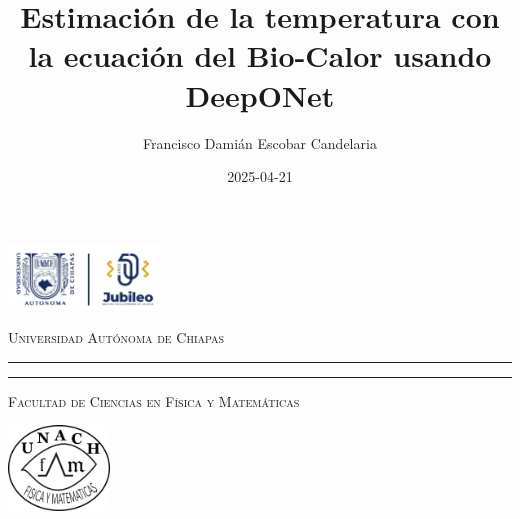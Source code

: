 \documentclass[
  spanish,
  us-letterpaper,
]{scrreprt}
\title{Estimación de la temperatura con la ecuación del Bio-Calor usando
DeepONet}
\author{Francisco Damián Escobar Candelaria}
\date{2025-04-21}
\theoremstyle{plain}
\theoremstyle{definition}
\theoremstyle{remark}
\begin{document}
\begin{titlepage}
\hspace{-1.7cm} %
\begin{minipage}[t][0.03\textheight][c]{0.22\textwidth}
        \includegraphics[width=4.0cm]{LOGO-JUBILEO.png}
\end{minipage}\hspace{0.9cm}
\begin{minipage}[t][0.03\textheight][c]{0.69\textwidth}
\begin{center}
                \textsc{\huge Universidad Autónoma de Chiapas}\\[0.3cm]
                \hrule height 2.5pt
                \vspace{0.2cm}
                \hrule height1pt
                \vspace{0.3cm}
                \textsc{\Large Facultad de Ciencias en Física y Matemáticas}
\end{center}
\end{minipage}\hspace{0.2cm}
\begin{minipage}[t][0.03\textheight][c]{0.2\textwidth}
		\includegraphics[width=2.7cm]{FCFMLOGO.png}
\end{minipage}\\
\begin{minipage}[t][0.93\textheight][c]{0.06\textwidth}
\vspace{60pt}
    \begin{center}
        \vrule width1pt height18cm
        \vspace{5mm}
        \vrule width2.5pt height18cm
        \vspace{5mm}
        \vrule width1pt height18cm
   \end{center}
\end{minipage}\hspace{1.3cm} %
\begin{minipage}[t][0.95\textheight][c]{0.76\textwidth}


\end{minipage}
\end{titlepage}
\end{document}
